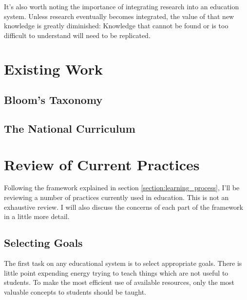     It's also worth noting the importance of integrating research into an education system. Unless research eventually becomes integrated, the value of that new knowledge is greatly diminished: Knowledge that cannot be found or is too difficult to understand will need to be replicated.

  \section{Existing Work}

    \subsection{Bloom's Taxonomy}
    \subsection{The National Curriculum}

  \section{Review of Current Practices}
    Following the framework explained in section \ref{section:learning_process}, I'll be reviewing a number of practices currently used in education. This is not an exhaustive review. I will also discuss the concerns of each part of the framework in a little more detail.

    \subsection{Selecting Goals}
      The first task on any educational system is to select appropriate goals. There is little point expending energy trying to teach things which are not useful to students. To make the most efficient use of available resources, only the most valuable concepts to students should be taught.

